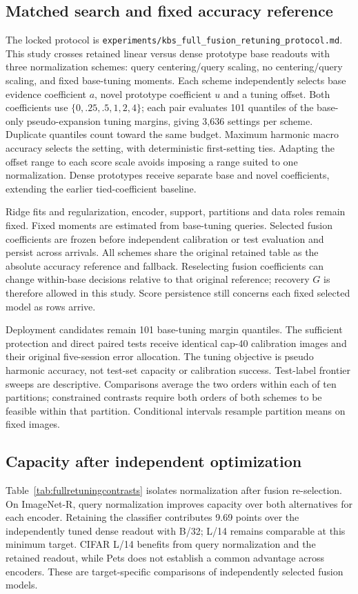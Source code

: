 \documentclass[preprint,review,12pt]{elsarticle}
\begin{document}
\subsection{Matched search and fixed accuracy reference}
The locked protocol is \nolinkurl{experiments/kbs_full_fusion_retuning_protocol.md}. This study crosses retained linear versus dense prototype base readouts with three normalization schemes: query centering/query scaling, no centering/query scaling, and fixed base-tuning moments. Each scheme independently selects base evidence coefficient $a$, novel prototype coefficient $u$ and a tuning offset. Both coefficients use $\{0,.25,.5,1,2,4\}$; each pair evaluates 101 quantiles of the base-only pseudo-expansion tuning margins, giving 3,636 settings per scheme. Duplicate quantiles count toward the same budget. Maximum harmonic macro accuracy selects the setting, with deterministic first-setting ties. Adapting the offset range to each score scale avoids imposing a range suited to one normalization. Dense prototypes receive separate base and novel coefficients, extending the earlier tied-coefficient baseline.

Ridge fits and regularization, encoder, support, partitions and data roles remain fixed. Fixed moments are estimated from base-tuning queries. Selected fusion coefficients are frozen before independent calibration or test evaluation and persist across arrivals. All schemes share the original retained table as the absolute accuracy reference and fallback. Reselecting fusion coefficients can change within-base decisions relative to that original reference; recovery $G$ is therefore allowed in this study. Score persistence still concerns each fixed selected model as rows arrive.

Deployment candidates remain 101 base-tuning margin quantiles. The sufficient protection and direct paired tests receive identical cap-40 calibration images and their original five-session error allocation. The tuning objective is pseudo harmonic accuracy, not test-set capacity or calibration success. Test-label frontier sweeps are descriptive. Comparisons average the two orders within each of ten partitions; constrained contrasts require both orders of both schemes to be feasible within that partition. Conditional intervals resample partition means on fixed images.

\subsection{Capacity after independent optimization}
Table~\ref{tab:fullretuningcontrasts} isolates normalization after fusion re-selection. On ImageNet-R, query normalization improves capacity over both alternatives for each encoder. Retaining the classifier contributes 9.69 points over the independently tuned dense readout with B/32; L/14 remains comparable at this minimum target. CIFAR L/14 benefits from query normalization and the retained readout, while Pets does not establish a common advantage across encoders. These are target-specific comparisons of independently selected fusion models.
\end{document}
